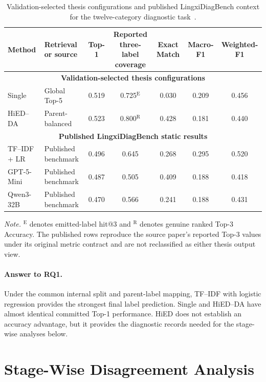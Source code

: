\begin{table}[H]
\centering
\caption{Validation-selected thesis configurations and published LingxiDiagBench context for the twelve-category diagnostic task~\citep{xu2026lingxidiagbench}.}
\label{tab:validation-configuration-matrix}
\small
\begin{adjustbox}{max width=\textwidth}
\begin{tabular}{|l|l|c|c|c|c|c|}
\hline
Method & Retrieval or source & Top-1 & \shortstack{Reported three-label\\coverage} & Exact Match & Macro-F1 & Weighted-F1\\
\hline
\multicolumn{7}{|c|}{\textbf{Validation-selected thesis configurations}}\\
\hline
Single & Global Top-5 & 0.519 & 0.725$^{\mathrm{E}}$ & 0.030 & 0.209 & 0.456\\
HiED--DA & Parent-balanced & 0.523 & 0.800$^{\mathrm{R}}$ & 0.428 & 0.181 & 0.440\\
\hline
\multicolumn{7}{|c|}{\textbf{Published LingxiDiagBench static results}}\\
\hline
TF--IDF + LR & Published benchmark & 0.496 & 0.645 & 0.268 & 0.295 & 0.520\\
GPT-5-Mini & Published benchmark & 0.487 & 0.505 & 0.409 & 0.188 & 0.418\\
Qwen3-32B & Published benchmark & 0.470 & 0.566 & 0.241 & 0.188 & 0.431\\
\hline
\end{tabular}
\end{adjustbox}
\parbox{0.96\textwidth}{\footnotesize
\textit{Note.} $^{\mathrm{E}}$ denotes emitted-label hit@3 and $^{\mathrm{R}}$ denotes genuine ranked Top-3 Accuracy. The published rows reproduce the source paper's reported Top-3 values under its original metric contract and are not reclassified as either thesis output view.
}
\end{table}

\paragraph{Answer to RQ1.}
Under the common internal split and parent-label mapping, TF--IDF with logistic regression provides the strongest final label prediction. Single and HiED--DA have almost identical committed Top-1 performance. HiED does not establish an accuracy advantage, but it provides the diagnostic records needed for the stage-wise analyses below.

\section{Stage-Wise Disagreement Analysis}
\label{sec:stage-wise-disagreement-results}

